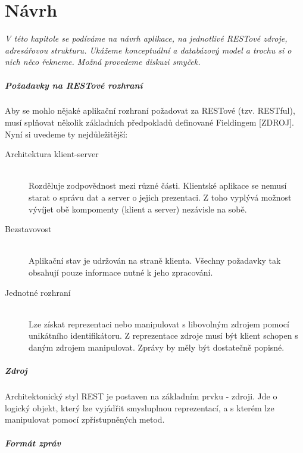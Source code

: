 \chapter{Návrh}

\textit{V této kapitole se podíváme na návrh aplikace, na jednotlivé RESTové zdroje,
adresářovou strukturu. Ukážeme konceptuální a databázový model a trochu si o nich něco řekneme.
Možná provedeme diskuzi smyček.}




\paragraph{Požadavky na RESTové rozhraní}

Aby se mohlo nějaké aplikační rozhraní požadovat za RESTové (tzv. RESTful),
musí splňovat několik základních předpokladů definované Fieldingem [ZDROJ].
Nyní si uvedeme ty nejdůležitější:

\begin{description}
    \item[Architektura klient-server] \hfill \\
    Rozděluje zodpovědnost mezi různé části. Klientské aplikace se nemusí starat o správu dat a server o jejich prezentaci.
    Z toho vyplývá možnost vývíjet obě kompomenty (klient a server) nezávisle na sobě.
    \item[Bezstavovost] \hfill \\
    Aplikační stav je udržován na straně klienta. Všechny požadavky tak obsahují pouze informace nutné k jeho zpracování.  
    \item[Jednotné rozhraní] \hfill \\
    Lze získat reprezentaci nebo manipulovat s libovolným zdrojem pomocí unikátního identifikátoru.
    Z reprezentace zdroje musí být klient schopen s daným zdrojem manipulovat. Zprávy by měly být dostatečně popisné.
\end{description}
 
\paragraph{Zdroj}

Architektonický styl REST je postaven na základním prvku - zdroji. Jde o logický objekt,
který lze vyjádřit smysluplnou reprezentací, a s kterém lze manipulovat pomocí zpřístupněných metod.


\paragraph{Formát zpráv}